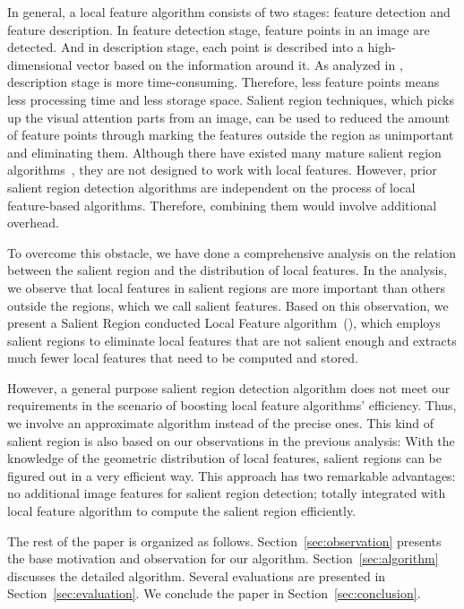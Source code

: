 In general, a local feature algorithm consists of two stages: feature detection and feature description. In feature detection stage, feature points in an image are detected. And in description stage, each point is described into a high-dimensional vector based on the information around it. As analyzed in \cite{adaptivepipelineicpp2012}, description stage is more time-consuming. Therefore, less feature points means less processing time and less storage space. Salient region techniques, which picks up the visual attention parts from an image, can be used to reduced the amount of feature points through marking the features outside the region as unimportant and eliminating them. Although there have existed many mature salient region algorithms~\cite{cheng2011global,achanta2009frequency,itti1998model}, they are not designed to work with local features. However, prior salient region detection algorithms are independent on the process of local feature-based algorithms. Therefore,  combining them would involve additional overhead.

To overcome this obstacle, we have done a comprehensive analysis on the relation between the salient region and the distribution of local features. In the analysis, we observe that local features in salient regions are more important than others outside the regions, which we call salient features. Based on this observation, we present a Salient Region conducted Local Feature algorithm~({\sys}), which employs salient regions to eliminate local features that are not salient enough and extracts much fewer local features that need to be computed and stored. 

However, a general purpose salient region detection algorithm does not meet our requirements in the scenario of boosting local feature algorithms' efficiency. Thus, we involve an approximate algorithm instead of the precise ones. This kind of salient region is also based on our observations in the previous analysis: With the knowledge of the geometric distribution of local features, salient regions can be figured out in a very efficient way. This approach has two remarkable advantages: no additional image features for salient region detection; totally integrated with local feature algorithm to compute the salient region efficiently. 



The rest of the paper is organized as follows. Section~\ref{sec:observation} presents the base motivation and observation for our algorithm. Section~\ref{sec:algorithm} discusses the detailed algorithm. Several evaluations are presented in Section~\ref{sec:evaluation}. We conclude the paper in Section~\ref{sec:conclusion}.